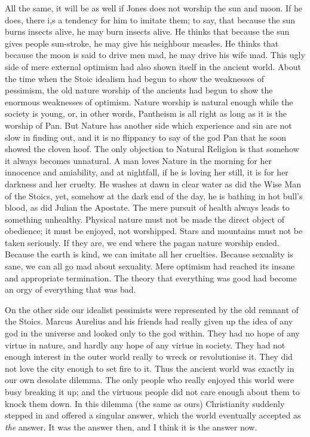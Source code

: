 \documentclass{book}
\begin{document}
All the same, it will be as well if Jones does not worship the sun and moon. If he does, there i,s a tendency for him to imitate them; to say, that because the sun burns insects alive, he may burn insects alive. He thinks that because the sun gives people sun-stroke, he may give his neighbour measles. He thinks that because the moon is said to drive men mad, he may drive his wife mad. This ugly side of mere external optimism had also shown itself in the ancient world. About the time when the Stoic idealism had begun to show the weaknesses of pessimism, the old nature worship of the ancients had begun to show the enormous weaknesses of optimism. Nature worship is natural enough while the society is young, or, in other words, Pantheism is all right as long as it is the worship of Pan. But Nature has another side which experience and sin are not slow in finding out, and it is no flippancy to say of the god Pan that he soon showed the cloven hoof. The only objection to Natural Religion is that somehow it always becomes unnatural. A man loves Nature in the morning for her innocence and amiability, and at nightfall, if he is loving her still, it is for her darkness and her cruelty. He washes at dawn in clear water as did the Wise Man of the Stoics, yet, somehow at the dark end of the day, he is bathing in hot bull’s blood, as did Julian the Apostate. The mere pursuit of health always leads to something unhealthy. Physical nature must not be made the direct object of obedience; it must be enjoyed, not worshipped. Stars and mountains must not be taken seriously. If they are, we end where the pagan nature worship ended. Because the earth is kind, we can imitate all her cruelties. Because sexuality is sane, we can all go mad about sexuality. Mere optimism had reached its insane and appropriate termination. The theory that everything was good had become an orgy of everything that was bad.

On the other side our idealist pessimists were represented by the old remnant of the Stoics. Marcus Aurelius and his friends had really given up the idea of any god in the universe and looked only to the god within. They had no hope of any virtue in nature, and hardly any hope of any virtue in society. They had not enough interest in the outer world really to wreck or revolutionise it. They did not love the city enough to set fire to it. Thus the ancient world was exactly in our own desolate dilemma. The only people who really enjoyed this world were busy breaking it up; and the virtuous people did not care enough about them to knock them down. In this dilemma (the same as ours) Christianity suddenly stepped in and offered a singular answer, which the world eventually accepted as \emph{the} answer. It was the answer then, and I think it is the answer now.
\end{document}
